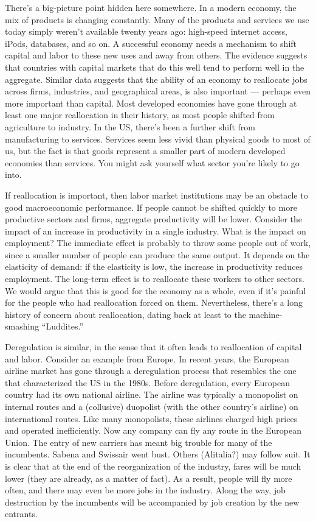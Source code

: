 \documentclass[letterpaper,12pt]{article}
\begin{document}
There's a big-picture point hidden here somewhere.  
In a modern economy, the mix of products is changing constantly. 
Many of the products and services we use today 
simply weren't available twenty years ago:  
high-speed internet access, iPods, databases, and so on.   
A successful economy needs a mechanism to shift 
capital and labor to these new uses and away from others.   
The evidence suggests that countries with capital markets
that do this well tend to perform well in the aggregate.  
Similar data suggests that 
the ability of an economy to reallocate jobs across
firms, industries, and geographical areas, is also important 
--- perhaps even more important than capital.   
Most developed economies have gone through at least one 
major reallocation in their history, 
as most people shifted from agriculture to industry.
In the US, there's been a further shift from manufacturing to services.
Services seem less vivid than physical goods to most of us, 
but the fact is that goods represent a smaller part of modern 
developed economies than services.  
You might ask yourself what sector you're likely to go into.  

If reallocation is important, 
then labor market institutions may be an obstacle to 
good macroeconomic performance.
If people cannot be shifted quickly to more productive sectors
and firms, aggregate productivity will be lower.  
Consider the impact of an increase in productivity in a single industry. 
What is the impact on employment?  
The immediate effect is probably to throw some people out of work, since
a smaller number of people can produce the same output.
It depends on the elasticity of demand:  if the elasticity is low, 
the increase in productivity reduces employment.  
The long-term effect is to reallocate these workers 
to other sectors.
We would argue that this is good for the economy as a whole, 
even if it's painful for the people who had reallocation forced on them.
Nevertheless, there's a long history of concern about reallocation, 
dating back at least to the machine-smashing ``Luddites.'' 


Deregulation is similar, in the sense that it often leads to reallocation of capital and labor.  Consider an example from Europe. In recent years, the European
airline market has gone through a deregulation process that
resembles the one that characterized the US in the 1980s. Before
deregulation, every European country had its own national airline.
The airline was typically a monopolist on internal routes and a
(collusive) duopolist (with the other country's airline) on
international routes.  Like many monopolists, these airlines
charged high prices and operated inefficiently.  Now any company
can fly any route in the European Union. The entry of new carriers
has meant big trouble
for many of the incumbents. Sabena and Swissair went bust. Others
(Alitalia?) may follow suit. It is clear that at the end
of the reorganization of the industry, fares will be much lower
(they are already, as a matter of fact). 
As a result, people will fly more often, 
 and there may even be more jobs in the industry. 
 Along the way, job destruction by the incumbents will be 
 accompanied by job creation by the new entrants.
\end{document}

